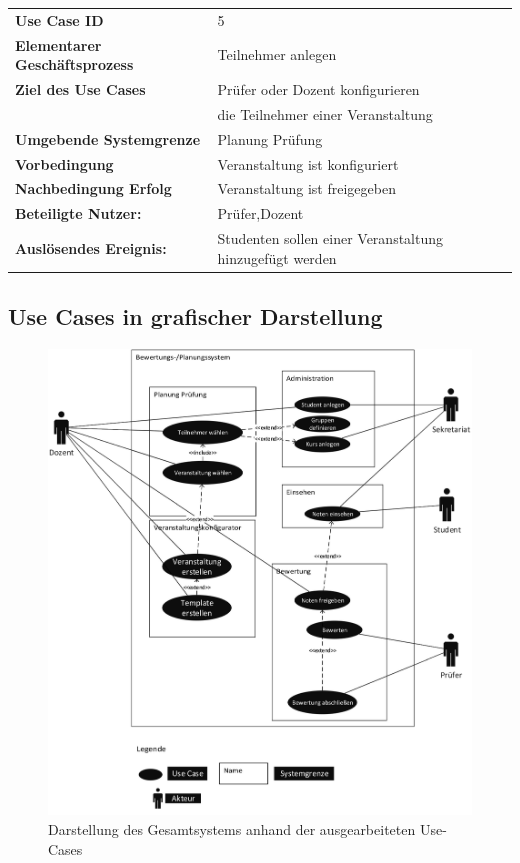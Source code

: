 			\begin{table}[H]
			\begin{tabular}{|ll}
			  \rowcolor{hellgrau}\textbf{Use Case ID} & 5 \\
		 	 \textbf{Elementarer Geschäftsprozess} &  Teilnehmer anlegen \\ 
			 \textbf{Ziel des Use Cases} & Prüfer oder Dozent konfigurieren \\& die Teilnehmer einer Veranstaltung  \\
			 \textbf{Umgebende Systemgrenze} & Planung Prüfung \\ 
			 \textbf{Vorbedingung} & Veranstaltung ist konfiguriert \\
			 \textbf{Nachbedingung Erfolg} & Veranstaltung ist freigegeben\\
			 			    
			 \textbf{Beteiligte Nutzer:} & Prüfer,Dozent \\ 
		     \textbf{Auslösendes Ereignis:} & Studenten sollen einer Veranstaltung hinzugefügt werden\\ 
			 
			\end{tabular} 
			\label{tab:usecase_5}
			\end{table}

						
		\clearpage
		\subsection{Use Cases in grafischer Darstellung}
		
	\begin{figure}[th!]
	\centering
	\includegraphics[width=\textwidth]{./img/use_case}
	\caption{Darstellung des Gesamtsystems anhand der ausgearbeiteten Use-Cases}
	\label{fig:use_case}
	\end{figure}
	\newpage
	
